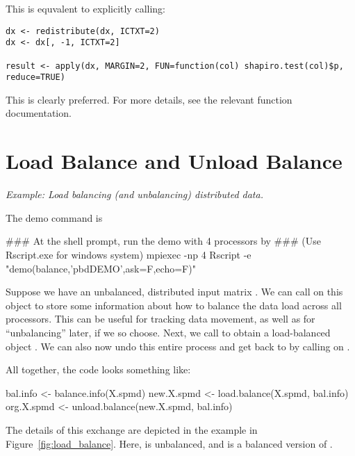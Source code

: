 This is equvalent to explicitly calling:

\begin{lstlisting}[language=rr,title=Implicit Redistributions]
dx <- redistribute(dx, ICTXT=2)
dx <- dx[, -1, ICTXT=2]

result <- apply(dx, MARGIN=2, FUN=function(col) shapiro.test(col)$p, reduce=TRUE)
\end{lstlisting}

This is clearly preferred.  For more details, see the relevant function documentation.




\section[Load Balance and Unload Balance]{Load Balance and Unload Balance}
\label{sec:lb_ub}

\emph{Example:  Load balancing (and unbalancing) distributed data.}

The demo command is
\begin{Command}
### At the shell prompt, run the demo with 4 processors by
### (Use Rscript.exe for windows system)
mpiexec -np 4 Rscript -e "demo(balance,'pbdDEMO',ask=F,echo=F)"
\end{Command}

Suppose we have an unbalanced, distributed input matrix .  We can call  on this object to store some information about how to balance the data load across all processors.  This can be useful for tracking data movement, as well as for ``unbalancing'' later, if we so choose.  Next, we call  to obtain a load-balanced object .  We can also now undo this entire process and get back to  by calling  on .

All together, the code looks something like:
\begin{Code}[title=R Code]
bal.info <- balance.info(X.spmd)
new.X.spmd <- load.balance(X.spmd, bal.info)
org.X.spmd <- unload.balance(new.X.spmd, bal.info)
\end{Code}

The details of this exchange are depicted in the example in Figure~\ref{fig:load_balance}.  Here, 
 is unbalanced, and  is a balanced version of .

